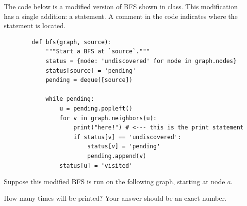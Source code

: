 \begin{prob}
    The code below is a modified version of BFS shown in class. This
    modification has a single addition: a  statement. A comment
    in the code indicates where the  statement is located.

    \begin{verbatim}
        def bfs(graph, source):
            """Start a BFS at `source`."""
            status = {node: 'undiscovered' for node in graph.nodes}
            status[source] = 'pending'
            pending = deque([source])

            while pending: 
                u = pending.popleft()
                for v in graph.neighbors(u):
                    print("here!") # <--- this is the print statement
                    if status[v] == 'undiscovered':
                        status[v] = 'pending'
                        pending.append(v)
                status[u] = 'visited'
    \end{verbatim}

    Suppose this modified BFS is run on the following graph, starting at node
    $a$.

    \begin{center} 
        
    \end{center}

    How many times will  be printed? Your answer should be an exact number.


\end{prob}
